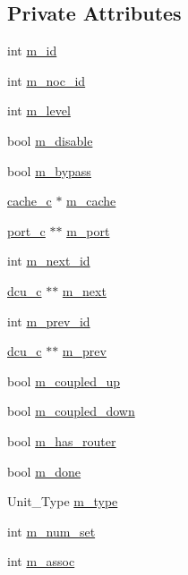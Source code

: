 \subsection*{Private Attributes}
\begin{DoxyCompactItemize}
\item 
int \hyperlink{classdcu__c_a61b5178afb8d6af167a3ca3c40aca074}{m\_\-id}
\item 
int \hyperlink{classdcu__c_a3ab8a45d54041c88b9556d2edf07b377}{m\_\-noc\_\-id}
\item 
int \hyperlink{classdcu__c_a04d10c0ce98426f7b14d37c8c60150c0}{m\_\-level}
\item 
bool \hyperlink{classdcu__c_af4dc606e05ca8664ef6a59027d599078}{m\_\-disable}
\item 
bool \hyperlink{classdcu__c_a1991249577b208be4483eeeb98f56295}{m\_\-bypass}
\item 
\hyperlink{classcache__c}{cache\_\-c} $\ast$ \hyperlink{classdcu__c_a6cb56729ba3f6fd05d8071adda723317}{m\_\-cache}
\item 
\hyperlink{classport__c}{port\_\-c} $\ast$$\ast$ \hyperlink{classdcu__c_a6fc4117756ccee0adf08285ad9ef9182}{m\_\-port}
\item 
int \hyperlink{classdcu__c_aaf2ea302ee6c02d0202c0073d12d1813}{m\_\-next\_\-id}
\item 
\hyperlink{classdcu__c}{dcu\_\-c} $\ast$$\ast$ \hyperlink{classdcu__c_a00edf5a77fc43d86790e0a04e7866833}{m\_\-next}
\item 
int \hyperlink{classdcu__c_aab67bf503b09b72441791fc20862c22c}{m\_\-prev\_\-id}
\item 
\hyperlink{classdcu__c}{dcu\_\-c} $\ast$$\ast$ \hyperlink{classdcu__c_a199065735dfd67fbbf17f1e7e73a0b27}{m\_\-prev}
\item 
bool \hyperlink{classdcu__c_aa455e9e2d2d70d9768b01427a5f2ce04}{m\_\-coupled\_\-up}
\item 
bool \hyperlink{classdcu__c_ac252e950738034b9eab0e1774e0e7de5}{m\_\-coupled\_\-down}
\item 
bool \hyperlink{classdcu__c_afd4171d11831e26978f2ce21659b17f8}{m\_\-has\_\-router}
\item 
bool \hyperlink{classdcu__c_aa0f7229cca750799c47e68e4b7025793}{m\_\-done}
\item 
Unit\_\-Type \hyperlink{classdcu__c_ab99a3a4fa14c08b977f91ea53e2d2d8c}{m\_\-type}
\item 
int \hyperlink{classdcu__c_a54ee473e45b0d1a45afe5f569c22d3c1}{m\_\-num\_\-set}
\item 
int \hyperlink{classdcu__c_a8166e3d9828dff8f41078d92767bd920}{m\_\-assoc}
$$
\end{DoxyCompactItemize}

